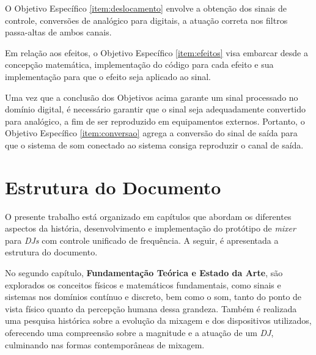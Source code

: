 O Objetivo Específico \ref{item:deslocamento} envolve a obtenção dos sinais de controle, conversões de analógico para digitais, a atuação correta nos filtros passa-altas de ambos canais.

Em relação aos efeitos, o Objetivo Específico \ref{item:efeitos} visa embarcar desde a concepção matemática, implementação do código para cada efeito e sua implementação para que o efeito seja aplicado ao sinal.

Uma vez que a conclusão dos Objetivos acima garante um sinal processado no domínio digital, é necessário garantir que o sinal seja adequadamente convertido para analógico, a fim de ser reproduzido em equipamentos externos. Portanto, o Objetivo Específico \ref{item:conversao} agrega a conversão do sinal de saída para que o sistema de som conectado ao sistema consiga reproduzir o canal de saída.

\section{Estrutura do Documento}

O presente trabalho está organizado em capítulos que abordam os diferentes aspectos da história, desenvolvimento e implementação do protótipo de \textit{mixer} para \textit{DJs} com controle unificado de frequência. A seguir, é apresentada a estrutura do documento.

No segundo capítulo, \textbf{Fundamentação Teórica e Estado da Arte}, são explorados os conceitos físicos e matemáticos fundamentais, como sinais e sistemas nos domínios contínuo e discreto, %
bem como o som, tanto do ponto de vista físico quanto da percepção humana dessa grandeza. Também é realizada uma pesquisa histórica sobre a evolução da mixagem e dos dispositivos utilizados, oferecendo uma compreensão sobre a magnitude e a atuação de um \textit{DJ}, culminando nas formas contemporâneas de mixagem.

